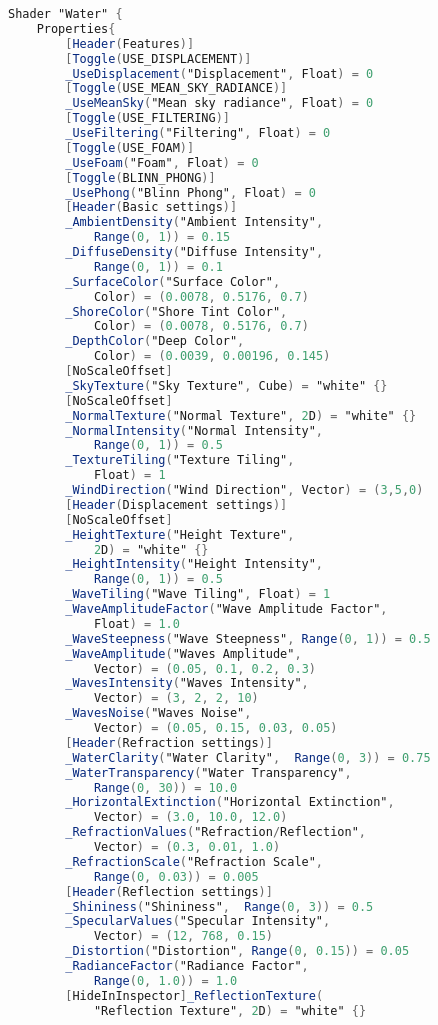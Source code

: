 \label{an:codigo-fonte-agua-unity}



\begin{lstlisting}[language=GLSL, caption={\label{cf:agua} Shader de efeito de água na Unity}]
Shader "Water" {
	Properties{
		[Header(Features)]
		[Toggle(USE_DISPLACEMENT)] 
		_UseDisplacement("Displacement", Float) = 0
		[Toggle(USE_MEAN_SKY_RADIANCE)] 
		_UseMeanSky("Mean sky radiance", Float) = 0
		[Toggle(USE_FILTERING)] 
		_UseFiltering("Filtering", Float) = 0
		[Toggle(USE_FOAM)]
		_UseFoam("Foam", Float) = 0
		[Toggle(BLINN_PHONG)] 
		_UsePhong("Blinn Phong", Float) = 0
		[Header(Basic settings)]
		_AmbientDensity("Ambient Intensity",  
			Range(0, 1)) = 0.15
		_DiffuseDensity("Diffuse Intensity",  
			Range(0, 1)) = 0.1
		_SurfaceColor("Surface Color", 
			Color) = (0.0078, 0.5176, 0.7)
		_ShoreColor("Shore Tint Color", 
			Color) = (0.0078, 0.5176, 0.7)
		_DepthColor("Deep Color", 
			Color) = (0.0039, 0.00196, 0.145)
		[NoScaleOffset]
		_SkyTexture("Sky Texture", Cube) = "white" {}
		[NoScaleOffset]
		_NormalTexture("Normal Texture", 2D) = "white" {}
		_NormalIntensity("Normal Intensity",  
			Range(0, 1)) = 0.5
		_TextureTiling("Texture Tiling", 
			Float) = 1
		_WindDirection("Wind Direction", Vector) = (3,5,0)
		[Header(Displacement settings)]
		[NoScaleOffset]
		_HeightTexture("Height Texture", 
			2D) = "white" {}
		_HeightIntensity("Height Intensity",  
			Range(0, 1)) = 0.5
		_WaveTiling("Wave Tiling", Float) = 1
		_WaveAmplitudeFactor("Wave Amplitude Factor",
			Float) = 1.0
		_WaveSteepness("Wave Steepness", Range(0, 1)) = 0.5
		_WaveAmplitude("Waves Amplitude", 
			Vector) = (0.05, 0.1, 0.2, 0.3)
		_WavesIntensity("Waves Intensity", 
			Vector) = (3, 2, 2, 10)
		_WavesNoise("Waves Noise", 
			Vector) = (0.05, 0.15, 0.03, 0.05)
		[Header(Refraction settings)]
		_WaterClarity("Water Clarity",  Range(0, 3)) = 0.75
		_WaterTransparency("Water Transparency",  
			Range(0, 30)) = 10.0
		_HorizontalExtinction("Horizontal Extinction", 
			Vector) = (3.0, 10.0, 12.0)
		_RefractionValues("Refraction/Reflection", 
			Vector) = (0.3, 0.01, 1.0)
		_RefractionScale("Refraction Scale",  
			Range(0, 0.03)) = 0.005
		[Header(Reflection settings)]
		_Shininess("Shininess",  Range(0, 3)) = 0.5
		_SpecularValues("Specular Intensity", 
			Vector) = (12, 768, 0.15)
		_Distortion("Distortion", Range(0, 0.15)) = 0.05
		_RadianceFactor("Radiance Factor", 
			Range(0, 1.0)) = 1.0
		[HideInInspector]_ReflectionTexture(
			"Reflection Texture", 2D) = "white" {}

\end{lstlisting}
